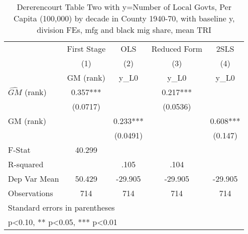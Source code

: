 \begin{table}[htbp]\centering
\def\sym#1{\ifmmode^{#1}\else\(^{#1}\)\fi}
\caption{Dererencourt Table Two with y=Number of Local Govts, Per Capita (100,000) by decade in County 1940-70, with baseline y, division FEs, mfg and black mig share, mean TRI}
\begin{tabular}{l*{4}{c}}
\toprule
                    & First Stage   &         OLS   &Reduced Form   &        2SLS   \\
                    &\multicolumn{1}{c}{(1)}&\multicolumn{1}{c}{(2)}&\multicolumn{1}{c}{(3)}&\multicolumn{1}{c}{(4)}\\
                    &\multicolumn{1}{c}{GM  (rank)}&\multicolumn{1}{c}{y\_L0}&\multicolumn{1}{c}{y\_L0}&\multicolumn{1}{c}{y\_L0}\\
\midrule
$\hat{GM}$ (rank)   &       0.357***&               &       0.217***&               \\
                    &    (0.0717)   &               &    (0.0536)   &               \\
\addlinespace
GM  (rank)          &               &       0.233***&               &       0.608***\\
                    &               &    (0.0491)   &               &     (0.147)   \\
\midrule
F-Stat              &      40.299   &               &               &               \\
R-squared           &               &        .105   &        .104   &               \\
Dep Var Mean        &      50.429   &     -29.905   &     -29.905   &     -29.905   \\
Observations        &         714   &         714   &         714   &         714   \\
\bottomrule
\multicolumn{5}{l}{\footnotesize Standard errors in parentheses}\\
\multicolumn{5}{l}{\footnotesize * p<0.10, ** p<0.05, *** p<0.01}\\
\end{tabular}
\end{table}
